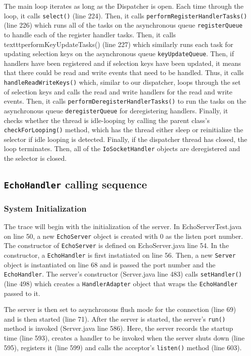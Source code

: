 \documentclass[letterpaper,12pt]{article}
\begin{document}
The main loop iterates as long as the Dispatcher is open. Each time through the loop, it calls \texttt{select()} (line 224). Then, it calls \texttt{performRegisterHandlerTasks()} (line 226) which runs all of the tasks on the asynchronous queue \texttt{registerQueue} to handle each of the register handler tasks. Then, it calls texttt{performKeyUpdateTasks()} (line 227) which similarly runs each task for updating selection keys on the asynchronous queue \texttt{keyUpdateQueue}. Then, if handlers have been registered and if selection keys have been updated, it means that there could be read and write events that need to be handled. Thus, it calls \texttt{handleReadWriteKeys()} which, similar to our dispatcher, loops through the set of selection keys and calls the read and write handlers for the read and write events. Then, it calls \texttt{performDeregisterHandlerTasks()} to run the tasks on the asynchronous queue \texttt{deregisterQueue} for deregistering handlers. Finally, it checks whether the thread is idle-looping by calling the parent class's \texttt{checkForLooping()} method, which has the thread either sleep or reinitialize the selector if idle looping is detected. Finally, if the dispatcher thread has closed, the loop terminates. Then, all of the \texttt{IoSocketHandler} objects are deregistered and the selector is closed.

\subsection{\texttt{EchoHandler} calling sequence}

\subsubsection{System Initialization}

The trace will begin with the initialization of the server. In EchoServerTest.java on line 50, a new \texttt{EchoServer} object is created with 0 as the listen port number. The constructor of \texttt{EchoServer} is defined on EchoServer.java line 54. In the constructor, a \texttt{EchoHandler} is first instatiated on line 56. Then, a new \texttt{Server} object is instantiated on line 68 and is passed the port number and the \texttt{EchoHandler}. The server's constructor (Server.java line 483) calls \texttt{setHandler()} (line 498) which creates a \texttt{HandlerAdapter} object that wraps the \texttt{EchoHandler} passed to it.

The server is then set to asynchronous flush mode for the connection (line 69) and is then started (line 71). After the server is started, the server's \texttt{run()} method is invoked (Server.java line 586). Here, the server records the startup time (line 593), creates a handler to be invoked when the server shuts down (line 595), registers it (line 599) and calls the acceptor's \texttt{listen()} method (line 603). 
\end{document}
